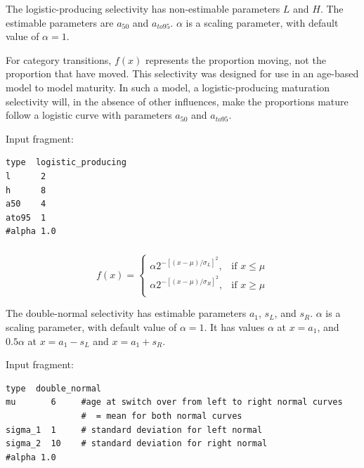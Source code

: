 The logistic-producing selectivity has non-estimable parameters $L$ and $H$. The estimable parameters are $a_{50}$ and $a_{to95}$. $\alpha$ is a scaling parameter, with default value of $\alpha = 1$.

For category transitions, $f(x)$ represents the proportion moving, not the proportion that have moved. This selectivity was designed for use in an age-based model to model maturity. In such a model, a logistic-producing maturation selectivity will, in the absence of other influences, make the proportions mature follow a logistic curve with parameters $a_{50}$ and $a_{to95}$.

Input fragment: {\small{\begin{verbatim}
type  logistic_producing
l      2
h      8
a50    4
ato95  1
#alpha 1.0
\end{verbatim}}}

\subsubsection[Double-normal]{}\label{sec:Selectivity-DoubleNormal}

\begin{equation}
  f(x) = \begin{cases}
    \alpha 2^{-[(x- \mu)/\sigma_L ]^2}, & \text{if $x \leq \mu$} \\
    \alpha 2^{-[(x- \mu)/\sigma_R ]^2}, & \text{if $x \ge \mu$}\\
  \end{cases}
\end{equation}

The double-normal selectivity has estimable parameters $a_1$, $s_L$, and $s_R$. $\alpha$ is a scaling parameter, with default value of $\alpha = 1$. It has values $\alpha$ at $x=a_1$, and $0.5 \alpha$ at $x=a_1-s_L$ and $x=a_1+s_R$.

Input fragment: {\small{\begin{verbatim}
type  double_normal
mu       6     #age at switch over from left to right normal curves
               #  = mean for both normal curves
sigma_1  1     # standard deviation for left normal
sigma_2  10    # standard deviation for right normal
#alpha 1.0
\end{verbatim}}}

\subsubsection[Double-exponential]{}\label{sec:Selectivity-DoubleExponential}

